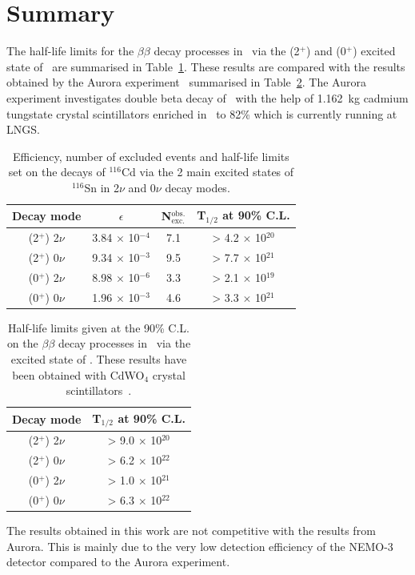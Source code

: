 \documentclass[main.tex]{subfiles}
\begin{document}
\FloatBarrier


\section{Summary}\label{sec:SummaryAnalysis}


\NI The half-life limits for the $\beta\beta$ decay processes in \Cd ~via the (2$^+$) and (0$^+$) excited state of \Sn ~are summarised in Table~\ref{tab:SummaryResultsAnalysis}. These results are compared with the results obtained by the Aurora experiment~\cite{Aurora} summarised in Table~\ref{tab:AuroraResults}. The Aurora experiment investigates double beta decay of \Cd ~with the help of 1.162~kg cadmium tungstate crystal scintillators enriched in \Cd ~to 82\% which is currently running at LNGS.



\begin{table}[h!]
\centering
\begin{tabular}{c|c|c|c}
Decay mode & $\epsilon$ & N$_{\text{exc.}}^{\text{obs.}}$ & T$_{\text{1/2}}$ at 90\% C.L. \\
\toprule
(2$^+$) 2$\nu$ & 3.84 $\times$ 10$^{-\text{4}}$ & 7.1 & > 4.2 $\times$ 10$^{\text{20}}$ \\[0.2cm]
(2$^+$) 0$\nu$ & 9.34 $\times$ 10$^{-\text{3}}$ & 9.5 & > 7.7 $\times$ 10$^{\text{21}}$ \\[0.2cm]
\hline
(0$^+$) 2$\nu$ & 8.98 $\times$ 10$^{-\text{6}}$ & 3.3 & > 2.1 $\times$ 10$^{\text{19}}$ \\[0.2cm]
(0$^+$) 0$\nu$ & 1.96 $\times$ 10$^{-\text{3}}$ & 4.6 & > 3.3 $\times$ 10$^{\text{21}}$ \\[0.2cm]
\bottomrule
\end{tabular}
\caption{Efficiency, number of excluded events and half-life limits set on the decays of $^{\text{116}}$Cd via the 2 main excited states of $^{\text{116}}$Sn in 2$\nu$ and 0$\nu$ decay modes.}
\label{tab:SummaryResultsAnalysis}
\end{table}


\begin{table}[h!]
\centering
\begin{tabular}{c|c}
Decay mode & T$_{\text{1/2}}$ at 90\% C.L. \\
\toprule
(2$^+$) 2$\nu$ & > 9.0 $\times$ 10$^{\text{20}}$ \\[0.2cm]
(2$^+$) 0$\nu$ & > 6.2 $\times$ 10$^{\text{22}}$ \\[0.2cm]
\hline
(0$^+$) 2$\nu$ & > 1.0 $\times$ 10$^{\text{21}}$ \\[0.2cm]
(0$^+$) 0$\nu$ & > 6.3 $\times$ 10$^{\text{22}}$ \\[0.2cm]
\bottomrule
\end{tabular}
\caption{Half-life limits given at the 90\% C.L. on the $\beta\beta$ decay processes in \Cd ~via the excited state of \Sn. These results have been obtained with CdWO$_\text{4}$ crystal scintillators~\cite{Aurora}.}
\label{tab:AuroraResults}
\end{table}


\NI The results obtained in this work are not competitive with the results from Aurora. This is mainly due to the very low detection efficiency of the NEMO-3 detector compared to the Aurora experiment.
\end{document}

